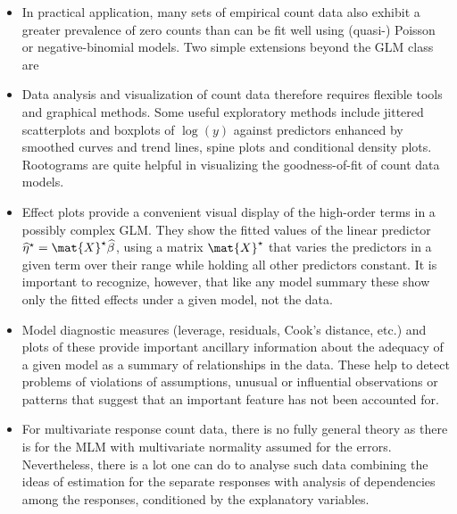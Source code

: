 \begin{itemize}
  \item In practical application, many sets of empirical count data also exhibit a greater prevalence of
  zero counts than can be fit well using (quasi-) Poisson or negative-binomial models.  Two simple
  extensions beyond the GLM class are

  \item Data analysis and visualization of count data therefore requires  flexible tools and graphical
  methods.  Some useful exploratory methods include jittered scatterplots and boxplots of $\log(y)$
  against predictors enhanced by smoothed curves and trend lines, spine plots and conditional density plots.
  Rootograms are quite helpful in visualizing the goodness-of-fit of count data models.

  \item Effect plots provide a convenient visual display of the high-order terms in a possibly complex GLM.
  They show the fitted values of the linear predictor $\widehat{\eta}^\star = \mat{X}^\star \widehat{\beta}$,
  using a matrix $\mat{X}^\star$ that varies the predictors in a given term over their range while holding
  all other predictors constant.  It is important to recognize, however, that like any model summary
  these show only the fitted
  effects under a given model, not the data.

  \item Model diagnostic measures (leverage, residuals, Cook's distance, etc.) and plots of these provide
  important ancillary information about the adequacy of a given model as a summary of relationships in the
  data.  These help to detect problems of violations of assumptions, unusual or influential observations
  or patterns that suggest that an important feature has not been accounted for.

  \item For multivariate response count data, there is no fully general theory as there is for the
  MLM with multivariate normality assumed for the errors.
  Nevertheless, there is a lot one can do to analyse such data combining the ideas of estimation for
  the separate responses with analysis of dependencies among the responses, conditioned by the
  explanatory variables.


\end{itemize} 